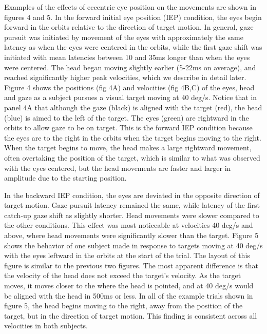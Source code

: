 \documentclass[12pt]{article}
\begin{document}
Examples of the effects of eccentric eye position on the movements are shown in figures 4 and 5. In the forward initial eye position (IEP) condition, the eyes begin forward in the orbits relative to the direction of target motion. In general, gaze pursuit was initiated by movement of the eyes with approximately the same latency as when the eyes were centered in the orbits, while the first gaze shift was initiated with mean latencies between 10 and 35ms longer than when the eyes were centered. The head began moving slightly earlier (5-22ms on average), and reached significantly higher peak velocities, which we describe in detail later. Figure 4 shows the positions (fig 4A) and velocities (fig 4B,C) of the eyes, head and gaze as a subject pursues a visual target moving at 40 deg/s. Notice that in panel 4A that although the gaze (black) is aligned with the target (red), the head (blue) is aimed to the left of the target. The eyes (green) are rightward in the orbits to allow gaze to be on target. This is the forward IEP condition because the eyes are to the right in the orbits when the target begins moving to the right. When the target begins to move, the head makes a large rightward movement, often overtaking the position of the target, which is similar to what was observed with the eyes centered, but the head movements are faster and larger in amplitude due to the starting position.  

In the backward IEP condition, the eyes are deviated in the opposite direction of target motion.  Gaze pursuit latency remained the same, while latency of the first catch-up gaze shift as slightly shorter. Head movements were slower compared to the other conditions. This effect was most noticeable at velocities 40 deg/s and above, where head movements were significantly slower than the target. Figure 5 shows the behavior of one subject made in response to targets moving at 40 deg/s with the eyes leftward in the orbits at the start of the trial. The layout of this figure is similar to the previous two figures. The most apparent difference is that the velocity of the head does not exceed the target’s velocity. As the target moves, it moves closer to the where the head is pointed, and at 40 deg/s would be aligned with the head in 500ms or less. In all of the example trials shown in figure 5, the head begins moving to the right, away from the position of the target, but in the direction of target motion. This finding is consistent across all velocities in both subjects. 
\end{document}
